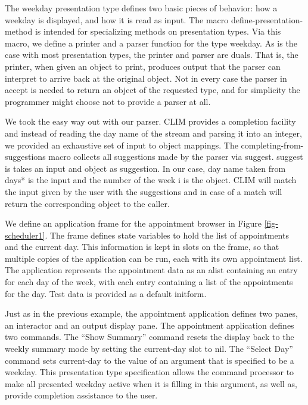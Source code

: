 \documentclass[twocolumn,a4paper]{article}
\newcommand {\code}[1]{{\sffamily #1}}
\newcommand {\CLIM}{{\small CLIM}}
\let\constant\code
\let\variable\code
\let\macro\code
\begin{document}
\begin{figure*}
\lstset{style=framestyle}

\caption{Scheduler: application frame, presentation type and commands}\label{fig-scheduler1}
\end{figure*}
\begin{figure*}
\lstset{style=framestyle}

\caption{Scheduler: display functions}\label{fig-scheduler2}
\end{figure*}

The weekday presentation type defines two basic pieces of behavior: how a weekday is displayed, and how it is read as input. The macro \macro{define-presentation-method} is intended for specializing methods on presentation types.  Via this macro, we define a printer and a parser function for the type \code{weekday}. As is the case with most presentation types, the printer and parser are duals. That is, the printer, when given an object to print, produces output that the parser can interpret to arrive back at the original object. Not in every case the parser in \code{accept} is needed to return an object of the requested type, and for simplicity the programmer might choose not to provide a parser at all.

We took the easy way out with our parser. \CLIM{} provides a completion facility and instead of reading the day name of the stream and parsing it into an integer, we provided an exhaustive set of input to object mappings. The \macro{completing-from-suggestions} macro collects all suggestions made by the parser via \code{suggest}. \code{suggest} is takes an input and object as suggestion. In our case, day name taken from \variable{*days*} is the input and the number of the week \variable{i} is the object. \CLIM{} will match the input given by the user with the suggestions and in case of a match will return the corresponding object to the caller.

We define an application frame for the appointment browser in Figure \ref{fig-scheduler1}. The frame defines state variables to hold the list of appointments and the current day. This information is kept in slots on the frame, so that multiple copies of the application can be run, each with its own appointment list. The application represents the appointment data as an alist containing an entry for each day of the week, with each entry containing a list of the appointments for the day. Test data is provided as a default initform.

Just as in the previous example, the appointment application defines two panes, an interactor and an output display pane. The appointment application defines two commands. The ``Show Summary'' command resets the display back to the weekly summary mode by setting the \variable{current-day} slot to \constant{nil}. The ``Select Day'' command sets \variable{current-day} to the value of an argument that is specified to be a weekday. This presentation type specification allows the command processor to make all presented weekday active when it is filling in this argument, as well as, provide completion assistance to the user.
\end{document}
